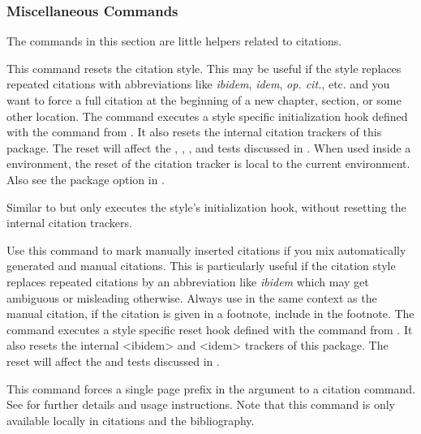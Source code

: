 \documentclass{ltxdockit}[2011/03/25]
\begin{document}
\subsubsection{Miscellaneous Commands}
\label{use:cit:msc}

The commands in this section are little helpers related to citations.

\begin{ltxsyntax}


This command resets the citation style. This may be useful if the style replaces repeated citations with abbreviations like \emph{ibidem}, \emph{idem}, \emph{op. cit.}, etc. and you want to force a full citation at the beginning of a new chapter, section, or some other location. The command executes a style specific initialization hook defined with the  command from . It also resets the internal citation trackers of this package. The reset will affect the , , , and  tests discussed in . When used inside a  environment, the reset of the citation tracker is local to the current  environment. Also see the  package option in .


Similar to  but only executes the style's initialization hook, without resetting the internal citation trackers.


Use this command to mark manually inserted citations if you mix automatically generated and manual citations. This is particularly useful if the citation style replaces repeated citations by an abbreviation like \emph{ibidem} which may get ambiguous or misleading otherwise. Always use  in the same context as the manual citation, \eg if the citation is given in a footnote, include  in the footnote. The  command executes a style specific reset hook defined with the  command from . It also resets the internal <ibidem> and <idem> trackers of this package. The reset will affect the  and  tests discussed in .


This command forces a single page prefix in the  argument to a citation command. See  for further details and usage instructions. Note that this command is only available locally in citations and the bibliography.


\end{ltxsyntax}
\end{document}
